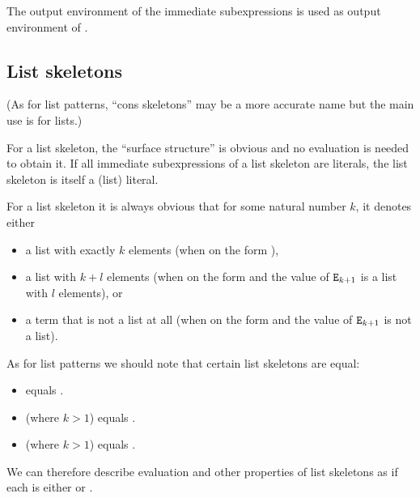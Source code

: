 \ENVIRONMENTS

The output environment of the immediate subexpressions is used as
output environment of
.

\subsection{List skeletons}

\label{section:list-skeletons}

(As for list patterns, ``cons skeletons'' may be a more accurate name but
the main use is for lists.)

For a list skeleton, the ``surface structure'' is obvious and no
evaluation is needed to obtain it.  If all immediate subexpressions of
a list skeleton are literals, the list skeleton is itself a (list)
literal.

\SYNTAX

\begin{rules}
       {\TXT{[} \TXT{]} \OR
        \TXT{[}   \TXT{]}}

       {\TXT{|} }
\end{rules}

\EVALUATION

For a list skeleton it is always obvious that for some natural number
$k$, it denotes either
\begin{itemize}
\item a list with exactly $k$ elements (when on the
form \T{[$\Z{E}_1$,\tdots,$\Z{E}_k$]}),
\item a list with $k+l$ elements (when on the form
\T{[$\Z{E}_1$,\tdots,$\Z{E}_k$|$\Z{E}_{k+1}$]} and the value
of ${\tt{\sl E}}_{k+1}$ is a list with $l$ elements), or
\item a term that is not a list at all (when on the form
\T{[$\Z{E}_1$,\tdots,$\Z{E}_k$|$\Z{E}_{k+1}$]} and the value
of ${\tt{\sl E}}_{k+1}$ is not a list).
\end{itemize}

As for list patterns we should note that certain list skeletons
are equal:
\begin{itemize}
\item \T{[$\Z{E}_1$]} equals \T{[$\Z{E}_1$|[]]}.
\item \T{[$\Z{E}_1$,$\Z{E}_2$,\tdots,$\Z{E}_k$]} (where $k>1$) equals \T{[$\Z{E}_1$|[$\Z{E}_2$,\tdots,$\Z{E}_k$]]}.
\item \T{[$\Z{E}_1$,$\Z{E}_2$,\tdots,$\Z{E}_k$|$\Z{E}_{k+1}$]} (where $k>1$) equals .
\end{itemize}
We can therefore describe evaluation and other properties of list skeletons as if each
 is either \TXT{[]} or \TXT{[}  \TXT{|}
 \TXT{]}.

